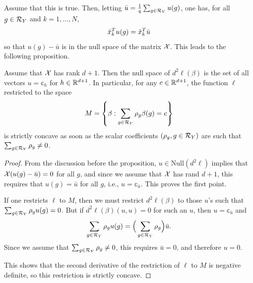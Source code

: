 Assume that  this is true. Then, 
letting $\bar u = \frac1q \sum_{g\in{\mathcal R}_Y}  u(g)$, one has, for all $g\in{\mathcal R}_Y$ and $k=1, \ldots, N$,
\[
{\tilde{x}}_{k}^{T} u(g) = {\tilde{x}}_{k}^{T} \bar u
\]
so that $u(g) - \bar u$ is in the null space of the matrix ${\mathcal X}$. This leads to the following proposition.
\begin{proposition}
\label{prop:log.reg.hess}
Assume that ${\mathcal X}$ has rank $d+1$. Then the null space of $d^2\ell(\beta)$ is the set of all vectors $u =\mathbb c_h $ for $h\in{\mathbb{R}}^{d+1}$. In particular, for any $c\in{\mathbb{R}}^{d+1}$, the function $\ell$ restricted to the space
\[
M = \left\{  \beta: \sum_{g\in {\mathcal R}_Y} \rho_g \beta(g) = c \right\}
\]
is strictly concave as soon as the scalar coefficients $(\rho_g, g\in{\mathcal R}_Y)$ are such that $\sum_{g\in{\mathcal R}_Y} \rho_g \neq 0$.
\end{proposition}
\begin{proof}
From the discussion before the proposition, $u\in \mathrm{Null}(d^2\ell)$ implies that ${\mathcal X}(u(g) - \bar u) =0$ for all $g$, and since we assume that ${\mathcal X}$ has rand $d+1$, this requires that $u(g) = \bar u$ for all $g$, i.e., $u = \mathbb c_{\bar u}$. This proves the first point. 

If one restricts $\ell$ to $M$, then we must restrict $d^2\ell(\beta)$ to those  $u$'s such that $\sum_{g\in {\mathcal R}_Y} \rho_g u(g) = 0$. But if $d^2\ell(\beta) (u,u) = 0$ for such an $u$, then $u = \mathbb c_{\bar u}$ and 
\[
\sum_{g\in {\mathcal R}_Y} \rho_g u(g) = \Big(\sum_{g\in {\mathcal R}_Y} \rho_g\Big) \bar u.
\]
Since we assume that $\sum_{g\in {\mathcal R}_Y} \rho_g\neq 0$, this requires $\bar u=0$, and therefore $u=0$.

This shows that the second derivative of the restriction of $\ell$ to $M$ is negative definite, so this restriction is strictly concave.
\end{proof}




